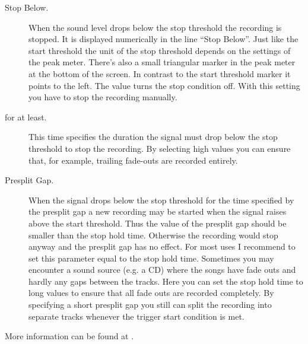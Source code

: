 \begin{description}
  \item[Stop Below.]
    When the sound level drops below the stop threshold the recording is stopped.
    It is displayed numerically in the line ``Stop Below''. Just like the start
    threshold the unit of the stop threshold depends on the settings of the peak
    meter. There's also a small triangular marker in the peak meter at the bottom
    of the screen. In contrast to the start threshold marker it points to the
    left. The value  turns the stop condition off. With this setting you
    have to stop the recording manually.
    
  \item[for at least.]
    This time specifies the duration the signal must drop below the stop
    threshold to stop the recording. By selecting high values you can ensure
    that, for example, trailing fade-outs are recorded entirely.
    
  \item[Presplit Gap.]
    When the signal drops below the stop threshold for the time specified by the
    presplit gap a new recording may be started when the signal raises above the
    start threshold. Thus the value of the presplit gap should be smaller than
    the stop hold time. Otherwise the recording would stop anyway and the
    presplit gap has no effect. For most uses I recommend to set this parameter
    equal to the stop hold time. Sometimes you may encounter a sound source (e.g.
    a CD) where the songs have fade outs and hardly any gaps between the tracks.
    Here you can set the stop hold time to long values to ensure that all fade
    outs are recorded completely. By specifying a short presplit gap you still
    can split the recording into separate tracks whenever the trigger start
    condition is met.
    
  \end{description}
  
More information can be found at .
  
